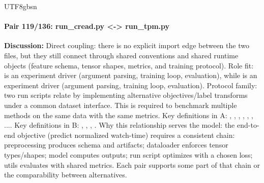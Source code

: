 \documentclass[11pt]{article}
\begin{document}
\begin{CJK*}{UTF8}{gbsn}
\paragraph{Pair 119/136: run\_cread.py <-> run\_tpm.py}
\textbf{Discussion:} Direct coupling: there is no explicit import edge between the two files, but they still connect through shared conventions and shared runtime objects (feature schema, tensor shapes, metrics, and training protocol). Role fit: \texttt{} is an experiment driver (argument parsing, training loop, evaluation), while \texttt{} is an experiment driver (argument parsing, training loop, evaluation). Protocol family: two run scripts relate by implementing alternative objectives/label transforms under a common dataset interface. This is required to benchmark multiple methods on the same data with the same metrics. Key definitions in A: \texttt{}, \texttt{}, \texttt{}, \texttt{}, \texttt{}, \texttt{}, .... Key definitions in B: \texttt{}, \texttt{}, \texttt{}, \texttt{}. Why this relationship serves the model: the end-to-end objective (predict normalized watch-time) requires a consistent chain: preprocessing produces schema and artifacts; dataloader enforces tensor types/shapes; model computes outputs; run script optimizes with a chosen loss; utils evaluates with shared metrics. Each pair supports some part of that chain or the comparability between alternatives.


\end{CJK*}
\end{document}
